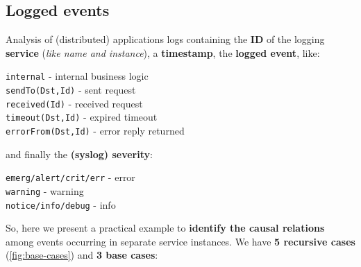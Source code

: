 \documentclass[10pt,a4paper]{report}
\begin{document}
\subsection{Logged events}
Analysis of (distributed) applications logs containing the \textbf{ID} of the logging \textbf{service} (\textit{like name and instance}), a \textbf{timestamp}, the \textbf{logged event}, like:
\begin{center}

	\texttt{internal} - internal business logic\\
	\texttt{sendTo(Dst,Id)} - sent request\\
	\texttt{received(Id)} - received request\\
	\texttt{timeout(Dst,Id)} - expired timeout\\
	\texttt{errorFrom(Dst,Id)} - error reply returned

\end{center}
and finally the \textbf{(syslog) severity}:
\begin{center}
	
	\texttt{emerg/alert/crit/err} - error\\
	\texttt{warning} - warning\\
	\texttt{notice/info/debug} - info\\
\end{center}
So, here we present a practical example to \textbf{identify the causal relations} among events occurring in separate service instances. We have \textbf{5 recursive cases} (\ref{fig:base-cases}) and \textbf{3 base cases}:
\end{document}
